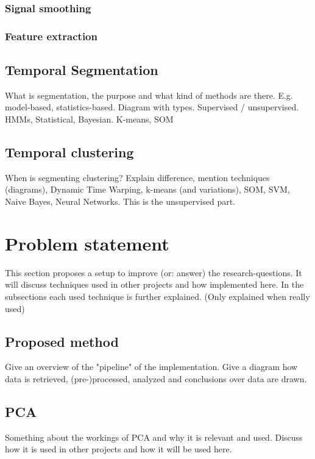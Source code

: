 \documentclass[a4paper,10pt]{extarticle}
\begin{document}
    \subsubsection{Signal smoothing}

    \subsubsection{Feature extraction}

	\subsection{Temporal Segmentation}
  What is segmentation, the purpose and what kind of methods are there.
  E.g. model-based, statistics-based. Diagram with types. Supervised / unsupervised.
  HMMs, Statistical, Bayesian. K-means, SOM

  \subsection{Temporal clustering}
  When is segmenting clustering? Explain difference, mention techniques (diagrams), Dynamic Time Warping, k-means (and variations), SOM, SVM, Naive Bayes, Neural Networks.
  This is the unsupervised part.




\section{Problem statement}
This section proposes a setup to improve (or: answer) the research-questions.
It will discuss techniques used in other projects and how implemented here.
In the subsections each used technique is further explained. (Only explained when really used)

  \subsection{Proposed method}
  Give an overview of the "pipeline" of the implementation.
  Give a diagram how data is retrieved, (pre-)processed, analyzed and conclusions over data are drawn.

  \subsection{PCA}
  Something about the workings of PCA and why it is relevant and used.
  Discuss how it is used in other projects and how it will be used here.
\end{document}
